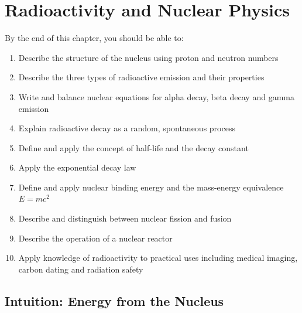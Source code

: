 %

\chapter{Radioactivity and Nuclear Physics}
\label{ch:radioactivity}
\minitoc
\newpage


\begin{objectivebox}
By the end of this chapter, you should be able to:
\begin{enumerate}[noitemsep]
  \item Describe the structure of the nucleus using
  proton and neutron numbers
  \item Describe the three types of radioactive
  emission and their properties
  \item Write and balance nuclear equations for
  alpha decay, beta decay and gamma emission
  \item Explain radioactive decay as a random,
  spontaneous process
  \item Define and apply the concept of half-life
  and the decay constant
  \item Apply the exponential decay law
  \item Define and apply nuclear binding energy
  and the mass-energy equivalence $E = mc^2$
  \item Describe and distinguish between nuclear
  fission and fusion
  \item Describe the operation of a nuclear reactor
  \item Apply knowledge of radioactivity to
  practical uses including medical imaging, carbon
  dating and radiation safety
\end{enumerate}
\end{objectivebox}

\section{Intuition: Energy from the Nucleus}

